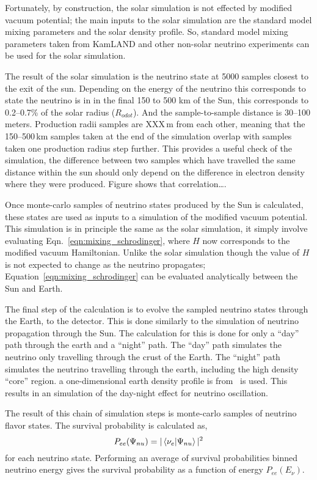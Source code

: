 Fortunately, by construction, the solar simulation is not effected by modified
vacuum potential; the main inputs to the solar simulation are the standard model
mixing parameters and the solar density profile. So, standard model mixing parameters
taken from KamLAND and other non-solar neutrino experiments can be used for
the solar simulation.

The result of the solar simulation is the neutrino state at 5000 samples
closest to the exit of the sun. Depending on the energy of the neutrino this
corresponds to state the neutrino is in in the final  150 to 500 km of
the Sun, this corresponds to \numrange{0.2}{0.7}\% of the solar radius ($R_{odot}$).
And the sample-to-sample distance is \numrange{30}{100} meters.
Production radii samples are XXX\,m from each other, meaning that
the \numrange{150}{500}\,km samples taken at the end of the simulation
overlap with samples taken one production radius step further.
This provides a useful check of the simulation, the difference between two
samples which have travelled the same distance within the sun should only depend
on the difference in electron density where they were produced.
Figure shows that correlation\ldots.%

Once  monte-carlo samples of neutrino states produced by the Sun is calculated, these
states are used as inputs to a simulation of the modified vacuum potential.
This simulation is in principle the same as the solar simulation,
it simply involve evaluating Eqn.~\ref{eqn:mixing_schrodinger}, where $H$ now
corresponds to the modified vacuum Hamiltonian.
Unlike the solar simulation though the value of $H$ is not expected to change
as the neutrino propagates; Equation~\ref{eqn:mixing_schrodinger} can be evaluated analytically
between the Sun and Earth.

The final step of the calculation is to evolve the sampled neutrino states through
the Earth, to the detector.
This is done similarly to the simulation of neutrino propagation through the
Sun.
The calculation for this is done for only a ``day'' path through the earth
and a ``night'' path. The ``day'' path simulates the neutrino only travelling
through the crust of the Earth. The ``night'' path simulates the neutrino
travelling through the earth, including the high density ``core'' region.
a one-dimensional earth density profile is from~\cite{PREM} is used.
This results in an simulation of the day-night effect for neutrino
oscillation.

The result of this chain of simulation steps is monte-carlo samples
of neutrino flavor states. The survival probability is calculated as,
\begin{equation}
P_{ee}(\Psi_{nu}) = |\bra{\nu_{e}}\ket{\Psi_{nu}}|^2
\end{equation}
for each neutrino state.
Performing an average of survival probabilities binned neutrino energy 
gives the survival probability as a function of energy $P_{ee}(E_{\nu})$.

